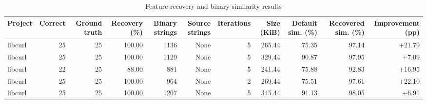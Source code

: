 \begin{table}[htbp]
\centering
\caption{Feature-recovery and binary-similarity results}
\label{tab:feature-recovery-results}
\small
\begin{tabular}{lrrrrrrrrrr}
\toprule
Project & Correct & Ground truth & Recovery (\%) & Binary strings & Source strings & Iterations & Size (KiB) & Default sim. (\%) & Recovered sim. (\%) & Improvement (pp) \\
\midrule
libcurl & 25 & 25 & 100.00 & 1136 & None & 5 & 265.44 & 75.35 & 97.14 & +21.79 \\
libcurl & 25 & 25 & 100.00 & 1129 & None & 5 & 329.44 & 90.87 & 97.95 & +7.09 \\
libcurl & 22 & 25 & 88.00 & 881 & None & 5 & 241.44 & 75.88 & 92.83 & +16.95 \\
libcurl & 25 & 25 & 100.00 & 964 & None & 2 & 269.44 & 75.51 & 97.61 & +22.10 \\
libcurl & 25 & 25 & 100.00 & 1207 & None & 5 & 345.44 & 91.13 & 98.05 & +6.91 \\
\bottomrule
\end{tabular}
\end{table}
